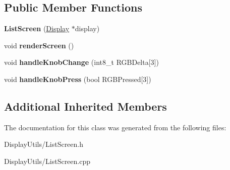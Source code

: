 \subsection*{Public Member Functions}
\begin{DoxyCompactItemize}
\item 
{\bfseries List\+Screen} (\hyperlink{classDisplay}{Display} $\ast$display)\hypertarget{classListScreen_a502ff7cf893ae6d10ed7bc1ca7a8ffe8}{}\label{classListScreen_a502ff7cf893ae6d10ed7bc1ca7a8ffe8}

\item 
void {\bfseries render\+Screen} ()\hypertarget{classListScreen_a364b4ccc88650c13295efae8431b135e}{}\label{classListScreen_a364b4ccc88650c13295efae8431b135e}

\item 
void {\bfseries handle\+Knob\+Change} (int8\+\_\+t R\+G\+B\+Delta\mbox{[}3\mbox{]})\hypertarget{classListScreen_a4e0f2e67dbfbcf8560209f01d2cab1c6}{}\label{classListScreen_a4e0f2e67dbfbcf8560209f01d2cab1c6}

\item 
void {\bfseries handle\+Knob\+Press} (bool R\+G\+B\+Pressed\mbox{[}3\mbox{]})\hypertarget{classListScreen_aecf861357be2b6debde43e61c9a7671b}{}\label{classListScreen_aecf861357be2b6debde43e61c9a7671b}

\end{DoxyCompactItemize}
\subsection*{Additional Inherited Members}


The documentation for this class was generated from the following files\+:\begin{DoxyCompactItemize}
\item 
Display\+Utils/List\+Screen.\+h\item 
Display\+Utils/List\+Screen.\+cpp\end{DoxyCompactItemize}
